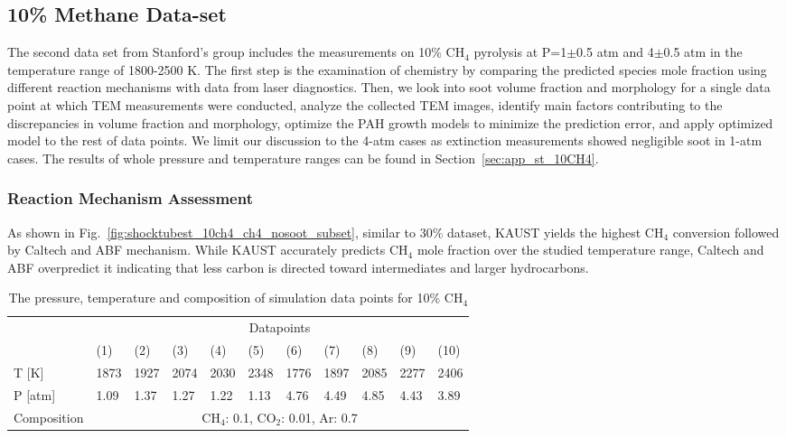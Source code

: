 %
%

\subsection{10\% Methane Data-set}

The second data set from Stanford's group includes the measurements on 10\% $\mathrm{CH_4}$ pyrolysis at P=1$\pm$0.5 atm and 4$\pm$0.5 atm in the temperature range of 1800-2500 K. The first step is the examination of chemistry by comparing the predicted species mole fraction using different reaction mechanisms with data from laser diagnostics. Then, we look into soot volume fraction and morphology for a single data point at which TEM measurements were conducted, analyze the collected TEM images, identify main factors contributing to the discrepancies in volume fraction and morphology, optimize the PAH growth models to minimize the prediction error, and apply optimized model to the rest of data points. We limit our discussion to the 4-atm cases as extinction measurements showed negligible soot in 1-atm cases. The results of whole pressure and temperature ranges can be found in Section~\ref{sec:app_st_10CH4}.  

\subsubsection{Reaction Mechanism Assessment}
As shown in Fig.~\ref{fig:shocktubest_10ch4_ch4_nosoot_subset}, similar to 30\% dataset, KAUST yields the highest $\mathrm{CH_4}$ conversion followed by Caltech and ABF mechanism. While KAUST accurately predicts $\mathrm{CH_4}$ mole fraction over the studied temperature range, Caltech and ABF overpredict it indicating that less carbon is directed toward intermediates and larger hydrocarbons.

\begin{table}[]
	\caption{The pressure, temperature and composition of simulation data points for 10\% $\mathrm{CH_4}$}
	\centering
	\begin{tabular}{l|llllllllll|}
		\cline{2-11}
		& \multicolumn{10}{c|}{Datapoints}                       \\ \cline{2-11} 
		& (1)  & (2)  & (3)  & (4)  & (5)  & (6)  & (7)  & (8) & (9) & (10)  \\ \hline
		\multicolumn{1}{|l|}{T {[}K{]}} & 1873  & 1927 & 2074 & 2030 & 2348 & 1776 & 1897 & 2085 & 2277 & 2406 \\ \hline
		\multicolumn{1}{|l|}{P {[}atm{]}} & 1.09 & 1.37 & 1.27 & 1.22 & 1.13 & 4.76 & 4.49 & 4.85 & 4.43 & 3.89 \\ \hline
		\multicolumn{1}{|l|}{Composition} & \multicolumn{10}{c|}{$\mathrm{CH_4}$: 0.1, $\mathrm{CO_2}$: 0.01, Ar: 0.7}               \\ \hline
	\end{tabular}
	\label{tab:shocktubest_CH4_10} 
\end{table}

